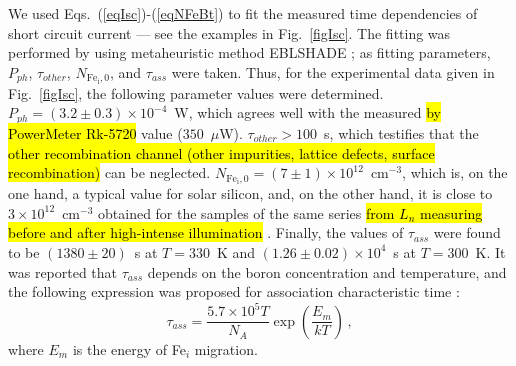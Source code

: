 \documentclass[sn-mathphys]{sn-jnl}%
\theoremstyle{thmstyleone}%
\theoremstyle{thmstyletwo}%
\theoremstyle{thmstylethree}%
\begin{document}
We used Eqs.~(\ref{eqIsc})-(\ref{eqNFeBt}) to fit the measured time dependencies of short circuit current ---
see the examples in Fig.~\ref{figIsc}.
The fitting was performed by using metaheuristic method EBLSHADE \cite{EBLSHADE};
as fitting parameters, $P_{ph}$, $\tau_{other}$, $N_\mathrm{Fe_i,0}$, and $\tau_{ass}$ were taken.
Thus, for the experimental data given in Fig.~\ref{figIsc}, the following parameter
values were determined.
$P_{ph}=(3.2\pm0.3)\times 10^{-4}$~W, which agrees well with the measured \hl{by PowerMeter Rk-5720} value
($350$~$\mu$W).
$\tau_{other}>100$~s,  which testifies that the \hl{ other recombination channel
(other impurities, lattice defects, surface recombination)} can be neglected.
$N_\mathrm{Fe_i,0}=(7\pm1)\times10^{12}$~cm$^{-3}$,
which is, on the one hand,
a typical value for solar silicon, and, on the other hand,
it is close to $3\times10^{12}$~cm$^{-3}$
obtained for the samples of the same series
\hl{from $L_n$ measuring before and after high-intense illumination} \cite{FeB_Zong}.
Finally, the values of $\tau_{ass}$ were found
to be $(1380\pm20)$~s at $T=330$~K and $(1.26\pm0.02)\times10^4$~s at $T=300$~K.
It was reported that $\tau_{ass}$ depends on the boron concentration and temperature,
and the following expression was proposed for association characteristic time \cite{FeBAssJAP2014}:
\begin{equation}
\label{eqTass}
\tau_{ass}=\frac{5.7\times10^5T}{N_A}\exp\left(\frac{E_m}{kT}\right)\,,
\end{equation}
where
$E_m$ is the energy of Fe$_i$ migration.
%
%
\end{document}
